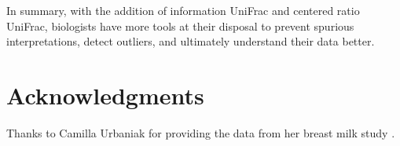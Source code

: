 \documentclass[10pt,letterpaper]{article}
\begin{document}
In summary, with the addition of information UniFrac and centered ratio UniFrac, biologists have more tools at their disposal to prevent spurious interpretations, detect outliers, and ultimately understand their data better.

\section*{Acknowledgments}
Thanks to Camilla Urbaniak for providing the data from her breast milk study \cite{urbaniak2016human}.

\nolinenumbers

%
%
% 

\end{document}
